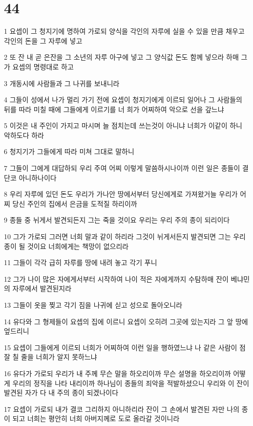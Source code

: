 \chapter{44}

\par 1 요셉이 그 청지기에 명하여 가로되 양식을 각인의 자루에 실을 수 있을 만큼 채우고 각인의 돈을 그 자루에 넣고
\par 2 또 잔 내 곧 은잔을 그 소년의 자루 아구에 넣고 그 양식값 돈도 함께 넣으라 하매 그가 요셉의 명령대로 하고
\par 3 개동시에 사람들과 그 나귀를 보내니라
\par 4 그들이 성에서 나가 멀리 가기 전에 요셉이 청지기에게 이르되 일어나 그 사람들의 뒤를 따라 미칠 때에 그들에게 이르기를 너 희가 어찌하여 악으로 선을 갚느냐
\par 5 이것은 내 주인이 가지고 마시며 늘 점치는데 쓰는것이 아니냐 너희가 이같이 하니 악하도다 하라
\par 6 청지기가 그들에게 따라 미쳐 그대로 말하니
\par 7 그들이 그에게 대답하되 우리 주여 어찌 이렇게 말씀하시나이까 이런 일은 종들이 결단코 아니하나이다
\par 8 우리 자루에 있던 돈도 우리가 가나안 땅에서부터 당신에게로 가져왔거늘 우리가 어찌 당신 주인의 집에서 은금을 도적질 하리이까
\par 9 종들 중 뉘게서 발견되든지 그는 죽을 것이요 우리는 우리 주의 종이 되리이다
\par 10 그가 가로되 그러면 너희 말과 같이 하리라 그것이 뉘게서든지 발견되면 그는 우리 종이 될 것이요 너희에게는 책망이 없으리라
\par 11 그들이 각각 급히 자루를 땅에 내려 놓고 각기 푸니
\par 12 그가 나이 많은 자에게서부터 시작하여 나이 적은 자에게까지 수탐하매 잔이 베냐민의 자루에서 발견된지라
\par 13 그들이 옷을 찢고 각기 짐을 나귀에 싣고 성으로 돌아오니라
\par 14 유다와 그 형제들이 요셉의 집에 이르니 요셉이 오히려 그곳에 있는지라 그 앞 땅에 엎드리니
\par 15 요셉이 그들에게 이르되 너희가 어찌하여 이런 일을 행하였느냐 나 같은 사람이 점 잘 칠 줄을 너희가 알지 못하느냐
\par 16 유다가 가로되 우리가 내 주께 무슨 말을 하오리이까 무슨 설명을 하오리이까 어떻게 우리의 정직을 나타 내리이까 하나님이 종들의 죄악을 적발하셨으니 우리와 이 잔이 발견된 자가 다 내 주의 종이 되겠나이다
\par 17 요셉이 가로되 내가 결코 그리하지 아니하리라 잔이 그 손에서 발견된 자만 나의 종이 되고 너희는 평안히 너희 아버지께로 도로 올라갈 것이니라
